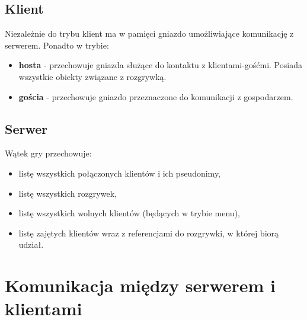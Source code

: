 \documentclass[a4paper, 12pt]{article}
\begin{document}
\subsection{Klient}
Niezależnie do trybu klient ma w pamięci gniazdo umożliwiające komunikację z serwerem.
Ponadto w trybie: 
  \begin{itemize}
   \item \textbf{hosta} - przechowuje gniazda służące do kontaktu z klientami-gośćmi. Posiada wszystkie obiekty związane z rozgrywką. 
   \item \textbf{gościa} - przechowuje gniazdo przeznaczone do komunikacji z gospodarzem.
  \end{itemize}
\subsection{Serwer}
Wątek gry przechowuje:
\begin{itemize}
 \item listę wszystkich połączonych klientów i ich pseudonimy,
 \item listę wszystkich rozgrywek,
 \item listę wszystkich wolnych klientów (będących w trybie menu),
 \item listę zajętych klientów wraz z referencjami do rozgrywki, w której biorą udział.
\end{itemize}


\section{Komunikacja między serwerem i klientami}
\label{sec:komunikacja}
\end{document}
